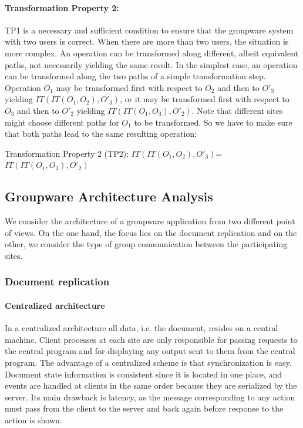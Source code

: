 \documentclass[11pt,a4paper]{article}
\begin{document}
\paragraph{Transformation Property 2:}
\label{sect:tp2}
TP1 is a necessary and sufficient condition to ensure that the groupware system with two users is correct. When there are more than two users, the situation is more complex. An operation can be transformed along different, albeit equivalent paths, not necessarily yielding the same result. In the simplest case, an operation can be transformed along the two paths of a simple transformation step. Operation $O_{1}$ may be transformed first with respect to $O_{2}$ and then to $O'_{3}$ yielding $IT(IT(O_{1},O_{2}),O'_{3})$, or it may be transformed first with respect to $O_{3}$ and then to $O'_{2}$ yielding $IT(IT(O_{1},O_{3}),O'_{2})$. Note that different sites might choose different paths for $O_{1}$ to be transformed. So we have to make sure that both paths lead to the same resulting operation:

\begin{defn}
Transformation Property 2 (TP2): 
$IT(IT(O_{1},O_{2}),O'_{3})$=$IT(IT(O_{1},O_{3}),O'_{2})$
\end{defn}


\subsection{Groupware Architecture Analysis} We consider the architecture of a groupware application from two different point of views. On the one hand, the focus lies on the document replication and on the other, we consider the type of group communication between the participating sites.

\subsubsection{Document replication}

\paragraph{Centralized architecture} In a centralized architecture all data, i.e. the document, resides on a central machine. Client processes at each site are only responsible for passing requests to the central program and for displaying any output sent to them from the central program. The advantage of a centralized scheme is that synchronization is easy. Document state information is consistent since it is located in one place, and events are handled at clients in the same order because they are serialized by the server. Its main drawback is latency, as the message corresponding to any action must pass from the client to the server and back again before response to the action is shown.
\end{document}
